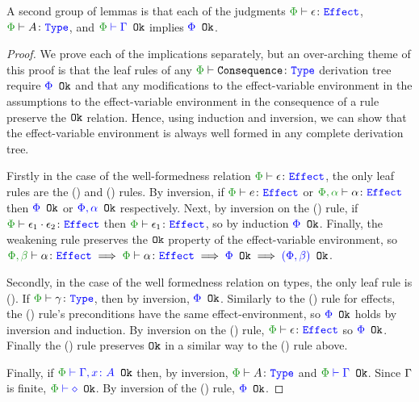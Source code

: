 \documentclass{Report}
\begin{document}
\begin{framed}
    \begin{lemma}
        A second group of lemmas is that each of the judgments  $\wellformedeffect{\P}{\e}$, $\wellformedtype{\P}{A}$, and $\oke{\P}{\G}$ implies ${\color{blue} \Phi} \texttt{ Ok}$.
    \end{lemma}
    
    \begin{proof}
        We prove each of the implications separately, but an over-arching theme of this proof is that the leaf rules of any $\wellformedtype{\P}{\texttt{Consequence}}$ derivation tree require ${\color{blue} \Phi} \texttt{ Ok}$ and that any modifications to the effect-variable environment in the assumptions to the effect-variable environment in the consequence of a rule preserve the $\texttt{Ok}$ relation. Hence, using induction and inversion, we can show that the effect-variable environment is always well formed in any complete derivation tree.
    
        Firstly in the case of the well-formedness relation $\wellformedeffect{\P}{\e}$, the only leaf rules are the (\textit{\eground}) and (\textit{\evar}) rules. By inversion, if $\wellformedeffect{\P}{e}$ or $\wellformedeffect{\P, \a}{\a}$ then ${\color{blue} \Phi} \texttt{ Ok}$ or ${\color{blue} \Phi, \alpha} \texttt{ Ok}$ respectively. Next, by inversion on the (\textit{\ecompose}) rule, if $\wellformedeffect{\P}{\e_1\dot\e_2}$ then $\wellformedeffect{\P}{\e_1}$, so by induction ${\color{blue} \Phi} \texttt{ Ok}$. Finally, the weakening rule preserves the $\texttt{Ok}$ property of the effect-variable environment, so $\wellformedeffect{\P, \b}{\a} \implies \wellformedeffect{\P}{\a} \implies \ok{\P} \implies \ok{(\P, \b)}$.
    
        Secondly, in the case of the well formedness relation on types, the only leaf rule is (\textit{\tground}). If $\wellformedtype{\P}{\g}$, then by inversion, ${\color{blue} \Phi} \texttt{ Ok}$. Similarly to the (\textit{\ecompose}) rule for effects, the (\textit{\tfun}) rule's preconditions have the same effect-environment, so ${\color{blue} \Phi} \texttt{ Ok}$ holds by inversion and induction. By inversion on the (\textit{\teffect}) rule, $\wellformedeffect{\P}{\e}$ so ${\color{blue} \Phi} \texttt{ Ok}$. Finally the (\textit{\tquant}) rule preserves $\texttt{Ok}$ in a similar way to the (\textit{\eweaken}) rule above.
    
        Finally, if $\oke{\P}{\gax}$ then, by inversion, $\wellformedtype{\P}{A}$  and $\oke{\P}{\G}$. Since $\Gamma$ is finite, $\oke{\P}{\nil}$. By inversion of the (\textit{\envnil}) rule, ${\color{blue} \Phi} \texttt{ Ok}$.
    \end{proof}
    
\end{framed}
\end{document}

